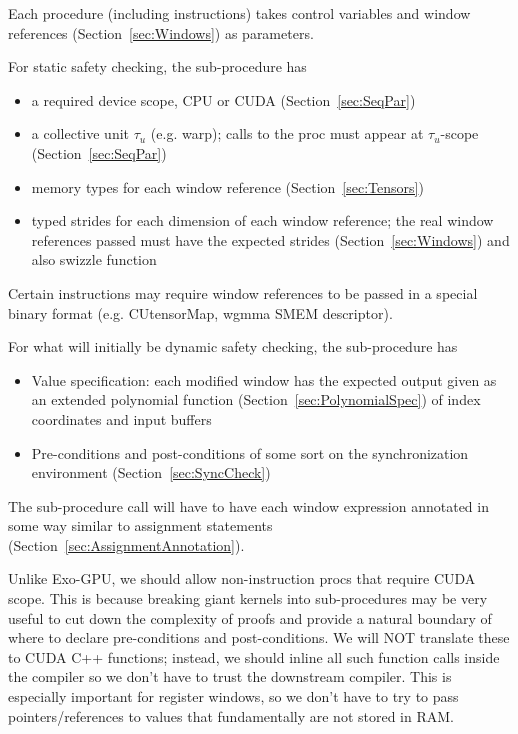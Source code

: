
Each procedure (including instructions) takes control variables and window references (Section~\ref{sec:Windows}) as parameters.

For static safety checking, the sub-procedure has
\begin{itemize}
  \item a required device scope, CPU or CUDA (Section~\ref{sec:SeqPar})
  \item a collective unit $\tau_u$ (e.g. warp); calls to the proc must appear at $\tau_u$-scope (Section~\ref{sec:SeqPar})
  \item memory types for each window reference (Section~\ref{sec:Tensors})
  \item typed strides for each dimension of each window reference; the real window references passed must have the expected strides (Section~\ref{sec:Windows}) and also swizzle function
\end{itemize}

Certain instructions may require window references to be passed in a special binary format (e.g. CUtensorMap, wgmma SMEM descriptor).

For what will initially be dynamic safety checking, the sub-procedure has
\begin{itemize}
  \item Value specification: each modified window has the expected output given as an extended polynomial function (Section~\ref{sec:PolynomialSpec}) of index coordinates and input buffers
  \item Pre-conditions and post-conditions of some sort on the synchronization environment (Section~\ref{sec:SyncCheck})
\end{itemize}

The sub-procedure call will have to have each window expression annotated in some way similar to assignment statements (Section~\ref{sec:AssignmentAnnotation}).

Unlike Exo-GPU, we should allow non-instruction procs that require CUDA scope.
This is because breaking giant kernels into sub-procedures may be very useful to cut down the complexity of proofs and provide a natural boundary of where to declare pre-conditions and post-conditions.
We will NOT translate these to CUDA C++  functions; instead, we should inline all such function calls inside the compiler so we don't have to trust the downstream compiler.
This is especially important for register windows, so we don't have to try to pass pointers/references to values that fundamentally are not stored in RAM.
